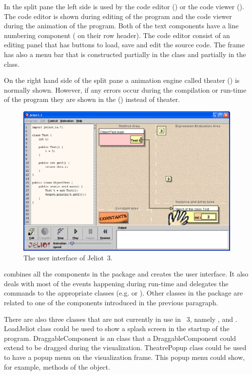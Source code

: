 In the split pane the left side is used by the code editor () or the code viewer (). The code editor is shown during editing of the program and the code viewer during the animation of the program. Both of the text components have a line numbering component ( on their row header). The code editor consist of an editing panel that has buttons to load, save and edit the source code. The frame has also a menu bar that is constructed partially in the  class and partially in the  class.

On the right hand side of the split pane a animation engine called theater () is normally shown. However, if any errors occur during the compilation or run-time of the program they are shown in the  () instead of theater.

\begin{figure}[htb]
\begin{center}
\includegraphics[width=\textwidth]{images/jeliot3.eps}
\caption{The user interface of Jeliot~3.}
\label{fig:jeliot3_UI}
\end{center}
\end{figure}

 combines all the components in the  package and creates the user interface. It also deals with most of the events happening during {run-time} and delegates the commands to the appropriate classes (e.g.  or ). Other classes in the  package are related to one of the components introduced in the previous paragraph.

There are also three classes that are not currently in use in \jel{}~3, namely ,  and . LoadJeliot class could be used to show a splash screen in the startup of the program. DraggableComponent is an class that a DraggableComponent could extend to be dragged during the visualization. TheatrePopup class could be used to have a popup menu on the visualization frame. This popup menu could show, for example, methods of the object.

